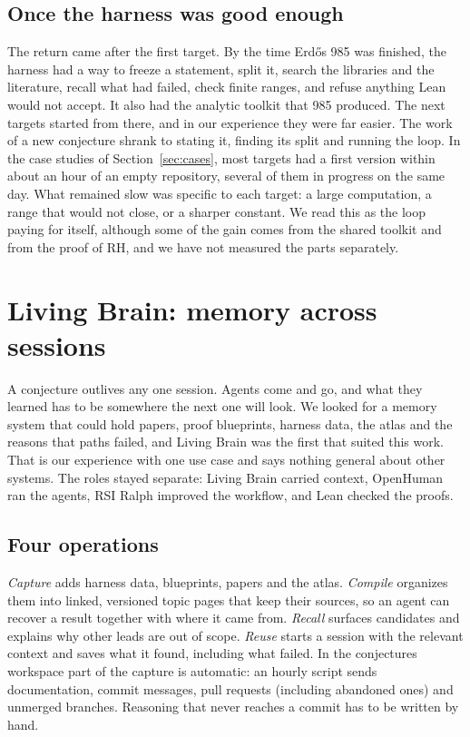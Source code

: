 \documentclass[11pt]{amsart}
\begin{document}
\subsection*{Once the harness was good enough} The return came after the first target. By the time Erd\H{o}s 985 was finished, the harness had a way to freeze a statement, split it, search the libraries and the literature, recall what had failed, check finite ranges, and refuse anything Lean would not accept. It also had the analytic toolkit that 985 produced. The next targets started from there, and in our experience they were far easier. The work of a new conjecture shrank to stating it, finding its split and running the loop. In the case studies of Section~\ref{sec:cases}, most targets had a first version within about an hour of an empty repository, several of them in progress on the same day. What remained slow was specific to each target: a large computation, a range that would not close, or a sharper constant. We read this as the loop paying for itself, although some of the gain comes from the shared toolkit and from the proof of RH, and we have not measured the parts separately.

\section{Living Brain: memory across sessions}\label{sec:memory}

A conjecture outlives any one session. Agents come and go, and what they learned has to be somewhere the next one will look. We looked for a memory system that could hold papers, proof blueprints, harness data, the atlas and the reasons that paths failed, and Living Brain \cite{livingbrain} was the first that suited this work. That is our experience with one use case and says nothing general about other systems. The roles stayed separate: Living Brain carried context, OpenHuman ran the agents, RSI Ralph improved the workflow, and Lean checked the proofs.

\subsection*{Four operations} \emph{Capture} adds harness data, blueprints, papers and the atlas. \emph{Compile} organizes them into linked, versioned topic pages that keep their sources, so an agent can recover a result together with where it came from. \emph{Recall} surfaces candidates and explains why other leads are out of scope. \emph{Reuse} starts a session with the relevant context and saves what it found, including what failed. In the conjectures workspace part of the capture is automatic: an hourly script sends documentation, commit messages, pull requests (including abandoned ones) and unmerged branches. Reasoning that never reaches a commit has to be written by hand.
\end{document}
